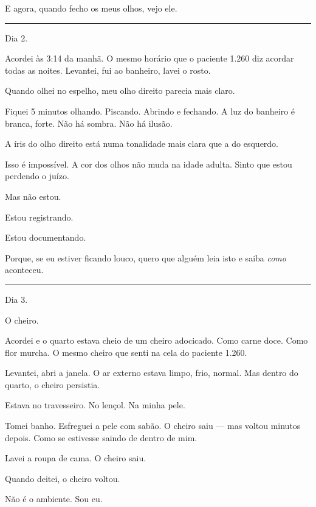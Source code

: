 \noindent E agora, quando fecho os meus olhos, vejo ele.

\vspace{0.5em}\noindent\rule{\textwidth}{0.5pt}\vspace{0.5em}

\noindent Dia 2.

\noindent Acordei às 3:14 da manhã. O mesmo horário que o paciente 1.260 diz acordar todas as noites. Levantei, fui ao banheiro, lavei o rosto.

\noindent Quando olhei no espelho, meu olho direito parecia mais claro.

\noindent Fiquei 5 minutos olhando. Piscando. Abrindo e fechando. A luz do banheiro é branca, forte. Não há sombra. Não há ilusão.

\noindent A íris do olho direito está numa tonalidade mais clara que a do esquerdo.

\noindent Isso é impossível. A cor dos olhos não muda na idade adulta. Sinto que estou perdendo o juízo.

\noindent Mas não estou.

\noindent Estou registrando.

\noindent Estou documentando.

\noindent Porque, se eu estiver ficando louco, quero que alguém leia isto e saiba \textit{como} aconteceu.

\vspace{0.5em}\noindent\rule{\textwidth}{0.5pt}\vspace{0.5em}

\noindent Dia 3.

\noindent O cheiro.

\noindent Acordei e o quarto estava cheio de um cheiro adocicado. Como carne doce. Como flor murcha. O mesmo cheiro que senti na cela do paciente 1.260.

\noindent Levantei, abri a janela. O ar externo estava limpo, frio, normal. Mas dentro do quarto, o cheiro persistia.

\noindent Estava no travesseiro. No lençol. Na minha pele.

\noindent Tomei banho. Esfreguei a pele com sabão. O cheiro saiu --- mas voltou minutos depois. Como se estivesse saindo de dentro de mim.

\noindent Lavei a roupa de cama. O cheiro saiu.

\noindent Quando deitei, o cheiro voltou.

\noindent Não é o ambiente. Sou eu.

